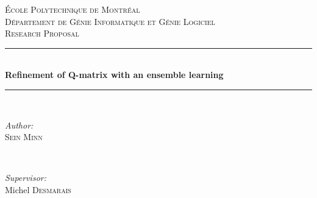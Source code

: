 \documentclass[12pt]{article}
\begin{document}
\begin{titlepage}

\newcommand{\HRule}{\rule{\linewidth}{0.5mm}} %

\center %
 

\textsc{\LARGE \'Ecole Polytechnique de Montr\'eal }\\[1.5cm] %
\textsc{\Large D\'epartement de G\'enie Informatique et G\'enie Logiciel}\\[0.5cm] %
\textsc{\large Research Proposal}\\[0.5cm] %


\HRule \\[0.4cm]
{ \huge \bfseries Refinement of Q-matrix with an ensemble learning}\\[0.4cm] %
\HRule \\[1.5cm]
 

\begin{minipage}{0.4\textwidth}
\begin{flushleft} \large
\emph{Author:}\\
\textsc{Sein Minn} %
\end{flushleft}
\end{minipage}
~
\begin{minipage}{0.4\textwidth}
\begin{flushright} \large
\emph{Supervisor:} \\
Michel  \textsc{Desmarais} %
\end{flushright}
\end{minipage}\\[4cm]



\end{titlepage}
\end{document}
